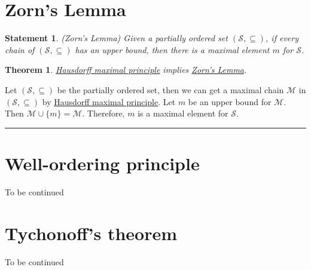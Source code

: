 \documentclass[12pt]{article}
\numberwithin{equation}{section}
\theoremstyle{plain} %
\newtheorem{theorem}[equation]{Theorem}
\newtheorem{statement}[equation]{Statement}
\theoremstyle{definition}
\theoremstyle{remark}
\newenvironment{proof}{{\bf Proof:}}{\hfill\rule{2mm}{2mm}}
\begin{document}
\section{Zorn's Lemma}

\begin{statement}
\label{statement:Zorn's Lemma}
\textup{(Zorn's Lemma)} \textit{Given a partially ordered set $(\mathcal{S}, \subseteq)$, if every chain of $(\mathcal{S}, \subseteq)$ has an upper bound, then there is a maximal element $m$ for $\mathcal{S}$. }
\end{statement}

\begin{theorem}
\hyperref[statement:Hausdorff maximal principle]{Hausdorff maximal principle} implies \hyperref[statement:Zorn's Lemma]{Zorn's Lemma}.
\end{theorem}

\begin{proof}
Let $(\mathcal{S}, \subseteq)$ be the partially ordered set, then we can get a maximal chain  $\mathcal{M}$ in $(\mathcal{S}, \subseteq)$ by \hyperref[statement:Hausdorff maximal principle]{Hausdorff maximal principle}. Let $m$ be an upper bound for $\mathcal{M}$. Then $\mathcal{M} \cup \{m\} = \mathcal{M}$. Therefore, $m$ is a maximal element for $\mathcal{S}$. 
\end{proof}

\section{Well-ordering principle}
To be continued

\section{Tychonoff's theorem}
To be continued


%  	
%
%


\end{document}
